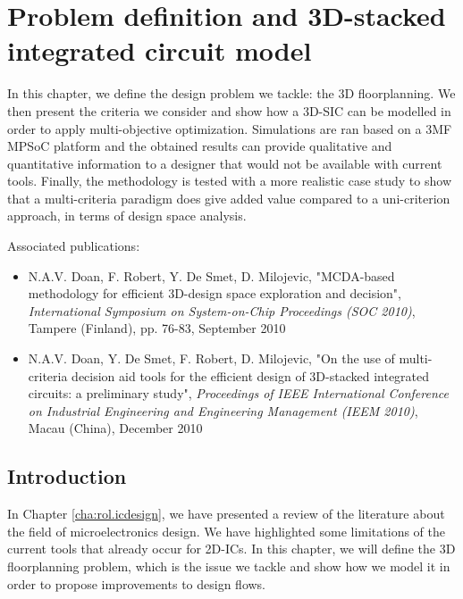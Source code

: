 \chapter{Problem definition and 3D-stacked integrated circuit model}
\label{cha:model}

\begin{summary}
In this chapter, we define the design problem we tackle: the 3D floorplanning. We then present the criteria we consider and show how a 3D-SIC can be modelled in order to apply multi-objective optimization. Simulations are ran based on a 3MF MPSoC platform and the obtained results can provide qualitative and quantitative information to a designer that would not be available with current tools. Finally, the methodology is tested with a more realistic case study to show that a multi-criteria paradigm does give added value compared to a uni-criterion approach, in terms of design space analysis.
\end{summary}

Associated publications:
\begin{itemize}
\item N.A.V. Doan, F. Robert, Y. De Smet, D. Milojevic, "MCDA-based methodology for efficient 3D-design space exploration and decision", \textit{International Symposium on System-on-Chip Proceedings (SOC 2010)}, Tampere (Finland), pp. 76-83, September 2010
\item N.A.V. Doan, Y. De Smet, F. Robert, D. Milojevic, "On the use of multi-criteria decision aid tools for the efficient design of 3D-stacked integrated circuits: a preliminary study", \textit{Proceedings of IEEE International Conference on Industrial Engineering and Engineering Management (IEEM 2010)}, Macau (China), December 2010
\end{itemize}

\section{Introduction}
In Chapter \ref{cha:rol.icdesign}, we have presented a review of the literature about the field of microelectronics design. We have highlighted some limitations of the current tools that already occur for 2D-ICs. In this chapter, we will define the 3D floorplanning problem, which is the issue we tackle and show how we model it in order to propose improvements to design flows.

